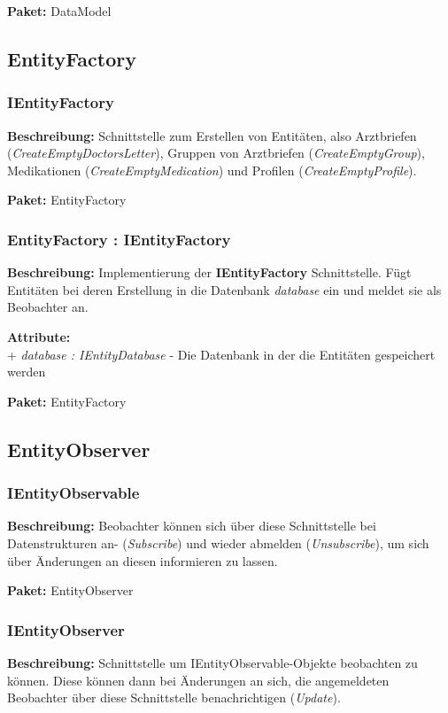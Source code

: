 \documentclass[a4paper]{scrreprt}
\begin{document}
\textbf{Paket:} DataModel

\subsection{EntityFactory}

\subsubsection{IEntityFactory}
\textbf{Beschreibung:} Schnittstelle zum Erstellen von Entitäten, also Arztbriefen (\textit{CreateEmptyDoctorsLetter}), Gruppen von Arztbriefen (\textit{CreateEmptyGroup}), Medikationen (\textit{CreateEmptyMedication}) und Profilen (\textit{CreateEmptyProfile}).

\textbf{Paket:} EntityFactory

\subsubsection{EntityFactory : IEntityFactory}
\textbf{Beschreibung:} Implementierung der \textbf{IEntityFactory} Schnittstelle. Fügt Entitäten bei deren Erstellung in die Datenbank \textit{database} ein und meldet sie als Beobachter an.

\textbf{Attribute:}\\
+ \textit{database : IEntityDatabase} - Die Datenbank in der die Entitäten gespeichert werden

\textbf{Paket:} EntityFactory


\subsection{EntityObserver}

\subsubsection{IEntityObservable}
\textbf{Beschreibung:} Beobachter können sich über diese Schnittstelle bei Datenstrukturen an- (\textit{Subscribe}) und wieder abmelden (\textit{Unsubscribe}), um sich über Änderungen an diesen informieren zu lassen.

\textbf{Paket:} EntityObserver

\subsubsection{IEntityObserver}
\textbf{Beschreibung:} Schnittstelle um IEntityObservable-Objekte beobachten zu können. Diese können dann bei Änderungen an sich, die angemeldeten Beobachter über diese Schnittstelle benachrichtigen (\textit{Update}).
\end{document}

